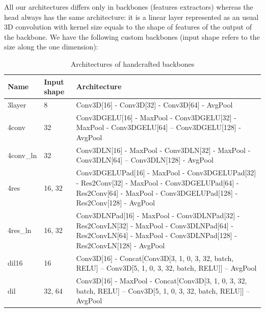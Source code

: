 \documentclass[twocolumn, a4paper]{article}
\theoremstyle{definition}
\begin{document}
All our architectures differs only in backbones (features extractors) whereas the head always
has the same architecture: it is a linear layer represented as an usual 3D convolution with kernel size
equals to the shape of features of the output of the backbone. We have the following custom backbones
(input shape refers to the size along the one dimension):
\begin{table}[ht]
    \begin{tabular}{p{1.2cm}p{1cm}p{5.3cm}}
        Name      & Input shape & Architecture                                                                                                                                                         \\
        \toprule
        3layer    & 8           & Conv3D[16] - Conv3D[32] - Conv3D[64] - AvgPool                                                                                                                       \\
        \hline
        4conv     & 32          & Conv3DGELU[16] - MaxPool - Conv3DGELU[32] - MaxPool - Conv3DGELU[64] -- Conv3DGELU[128] - AvgPool                                                                    \\
        \hline
        4conv\_ln & 32          & Conv3DLN[16] - MaxPool - Conv3DLN[32] - MaxPool - Conv3DLN[64] -- Conv3DLN[128] - AvgPool                                                                            \\
        \hline
        4res      & 16, 32      & Conv3DGELUPad[16] - MaxPool - Conv3DGELUPad[32] - Res2Conv[32] - MaxPool - Conv3DGELUPad[64] - Res2Conv[64] - MaxPool - Conv3DGELUPad[128] - Res2Conv[128] - AvgPool \\
        \hline
        4res\_ln  & 16, 32      & Conv3DLNPad[16] - MaxPool - Conv3DLNPad[32] - Res2ConvLN[32] - MaxPool - Conv3DLNPad[64] - Res2ConvLN[64] - MaxPool - Conv3DLNPad[128] - Res2ConvLN[128] - AvgPool   \\
        \hline
        dil16     & 16          & Conv3D[16] - Concat[Conv3D[3, 1, 0, 3, 32, batch, RELU] -- Conv3D[5, 1, 0, 3, 32, batch, RELU]] --  AvgPool                                                          \\
        \hline
        dil       & 32, 64      & Conv3D[16] - MaxPool - Concat[Conv3D[3, 1, 0, 3, 32, batch, RELU] -- Conv3D[5, 1, 0, 3, 32, batch, RELU]] --  AvgPool                                                \\
        \bottomrule
    \end{tabular}
    \caption{Architectures of handcrafted backbones}
    \label{tab:arch}
\end{table}
\end{document}
